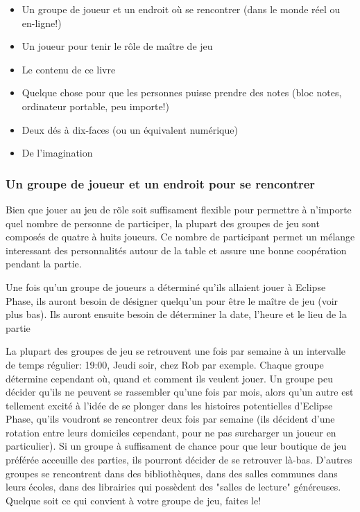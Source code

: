 \begin{itemize} \item Un groupe de joueur et un endroit où se rencontrer (dans le monde réel ou en-ligne!) \item Un joueur pour tenir le rôle de maître de jeu \item Le contenu de ce livre \item Quelque chose pour que les personnes puisse prendre des notes (bloc notes, ordinateur portable, peu importe!) \item Deux dés à dix-faces (ou un équivalent numérique) \item De l'imagination \end{itemize} 

\subsubsection{Un groupe de joueur et un endroit pour se rencontrer} \label{sec:group-players} 

Bien que jouer au jeu de rõle soit suffisament flexible pour permettre à n'importe quel nombre de personne de participer, la plupart des groupes de jeu sont composés de quatre à huits joueurs. Ce nombre de participant permet un mélange interessant des personnalités autour de la table et assure une bonne coopération pendant la partie. 

Une fois qu'un groupe de joueurs a déterminé qu'ils allaient jouer à Eclipse Phase, ils auront besoin de désigner quelqu'un pour être le maître de jeu (voir plus bas). Ils auront ensuite besoin de déterminer la date, l'heure et le lieu de la partie 

La plupart des groupes de jeu se retrouvent une fois par semaine à un intervalle de temps régulier: 19:00, Jeudi soir, chez Rob par exemple. Chaque groupe détermine cependant où, quand et comment ils veulent jouer. Un groupe peu décider qu'ils ne peuvent se rassembler qu'une fois par mois, alors qu'un autre est tellement excité à l'idée de se plonger dans les histoires potentielles d'Eclipse Phase, qu'ils voudront se rencontrer deux fois par semaine (ils décident d'une rotation entre leurs domiciles cependant, pour ne pas surcharger un joueur en particulier). Si un groupe à suffisament de chance pour que leur boutique de jeu préférée acceuille des parties, ils pourront décider de se retrouver là-bas. D'autres groupes se rencontrent dans des bibliothèques, dans des salles communes dans leurs écoles, dans des librairies qui possèdent des "salles de lecture" généreuses. Quelque soit ce qui convient à votre groupe de jeu, faites le! 

